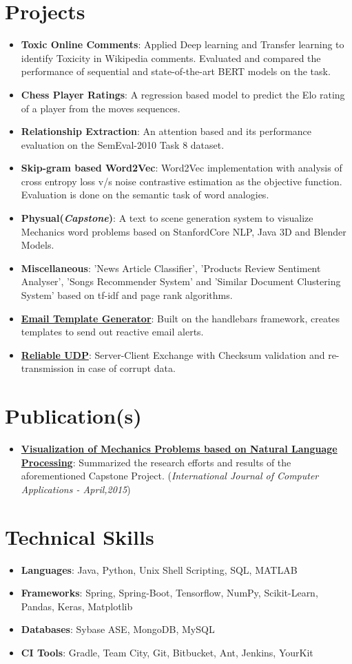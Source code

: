 \documentclass[letterpaper,11pt]{article}
\newcommand{\resumeItem}[2]{
  \item\small{
    \textbf{#1}{: #2 \vspace{-2pt}}
  }
}
\newcommand{\resumeSubItem}[2]{\resumeItem{#1}{#2}\vspace{-4pt}}
\newcommand{\resumeSubHeadingListStart}{\begin{itemize}[leftmargin=*]}
\newcommand{\resumeSubHeadingListEnd}{\end{itemize}}
\begin{document}
  
\section{{\faFlask} Projects}
  \resumeSubHeadingListStart
  \resumeSubItem{Toxic Online Comments} {
   Applied Deep learning and Transfer learning to identify Toxicity in Wikipedia comments. Evaluated and compared the performance of sequential and state-of-the-art BERT models on the task.
  }
   \resumeSubItem{Chess Player Ratings} {
    A regression based model to predict the Elo rating of a player from the moves sequences.
  }
   \resumeSubItem{Relationship Extraction}{An attention based and its performance evaluation on the SemEval-2010 Task 8 dataset.}
  \resumeSubItem{Skip-gram based Word2Vec}
      {Word2Vec implementation with analysis of cross entropy loss v/s noise contrastive estimation as the objective function. Evaluation is done on the semantic task of word analogies.}
  \resumeSubItem{Physual(\textit{Capstone})}
      {A text to scene generation system to visualize Mechanics word problems based on StanfordCore NLP, Java 3D and Blender Models.}
  \resumeSubItem{Miscellaneous}
    {'News Article Classifier', 'Products Review Sentiment Analyser', 'Songs Recommender System' and 'Similar Document Clustering System' based on tf-idf and page rank algorithms.
    }\resumeSubItem{\href{https://github.com/amanpreet692/HandleBarsEmailTemplate}
    {Email Template Generator}}
    {Built on the handlebars framework, creates templates to send out reactive email alerts.}       \resumeSubItem{\href{https://bitbucket.org/APS692/udp-with-error-detection} {Reliable UDP}}
      {Server-Client Exchange with Checksum validation and re-transmission in case of corrupt data.}
  \resumeSubHeadingListEnd

\section{Publication(s)}
  \resumeSubHeadingListStart
    \resumeSubItem{\href{http://research.ijcaonline.org/volume116/number14/pxc3902766.pdf}	{Visualization of Mechanics Problems based on Natural Language Processing}}
      {Summarized the research efforts and results of the aforementioned Capstone Project. (\textit{International Journal of Computer Applications - April,2015})}
      
\resumeSubHeadingListEnd

\section{Technical Skills}
 \resumeSubHeadingListStart
 \resumeSubItem{Languages}{Java, Python, Unix Shell Scripting, SQL, MATLAB}
 \resumeSubItem{Frameworks}{Spring, Spring-Boot, Tensorflow, NumPy, Scikit-Learn, Pandas, Keras, Matplotlib}
 \resumeSubItem{Databases}{Sybase ASE, MongoDB, MySQL}
 \resumeSubItem{CI Tools}{Gradle, Team City, Git, Bitbucket, Ant, Jenkins, YourKit}
 \resumeSubHeadingListEnd
\end{document}
